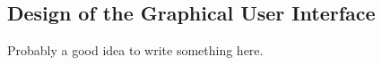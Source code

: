 \subsection{Design of the Graphical User Interface}
\label{subsec:designgui}

Probably a good idea to write something here.